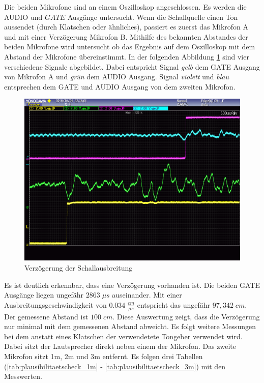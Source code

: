 Die beiden Mikrofone sind an einem Oszilloskop angeschlossen. Es werden die \si{AUDIO} und $GATE$ Ausgänge untersucht. Wenn die Schallquelle einen Ton aussendet (durch Klatschen oder ähnliches), passiert es zuerst das Mikrofon A und mit einer Verzögerung Mikrofon B. Mithilfe des bekannten Abstandes der beiden Mikrofone wird untersucht ob das Ergebnis auf dem Oszilloskop mit dem Abstand der Mikrofone übereinstimmt. In der folgenden Abbildung \ref{img:plausibilitaetscheck_oszi} sind vier verschiedene Signale abgebildet. Dabei entspricht Signal \textit{gelb} dem \si{GATE} Ausgang von Mikrofon A und \textit{grün} dem \si{AUDIO} Ausgang. Signal \textit{violett} und \textit{blau} entsprechen dem \si{GATE} und \si{AUDIO} Ausgang von dem zweiten Mikrofon.

\begin{figure}[H]
        \centering
        \hspace*{-1.9cm}
        \includegraphics[width=1.2\textwidth]{images/plausibilitaetscheck_oszi.png}
        \caption{Verzögerung der Schallausbreitung}
        \label{img:plausibilitaetscheck_oszi}
\end{figure}

Es ist deutlich erkennbar, dass eine Verzögerung vorhanden ist. Die beiden \si{GATE} Ausgänge liegen ungefähr $2863 \; \mu s$ auseinander. Mit einer Ausbreitungsgeschwindigkeit von $0.034 \; \frac{cm}{\mu s}$ entspricht das ungefähr $97,342 \; cm$. Der gemessene Abstand ist $100 \; cm$. Diese Auswertung zeigt, dass die Verzögerung nur minimal mit dem gemessenen Abstand abweicht. Es folgt weitere Messungen bei dem anstatt eines Klatschen der verwendetete Tongeber verwendet wird. Dabei sitzt der Lautsprecher direkt neben einem der Mikrofon. Das zweite Mikrofon sitzt \si{1}{m}, \si{2}{m} und \si{3}{m} entfernt. Es folgen drei Tabellen (\ref{tab:plausibilitaetscheck_1m} - \ref{tab:plausibilitaetscheck_3m}) mit den Messwerten.

